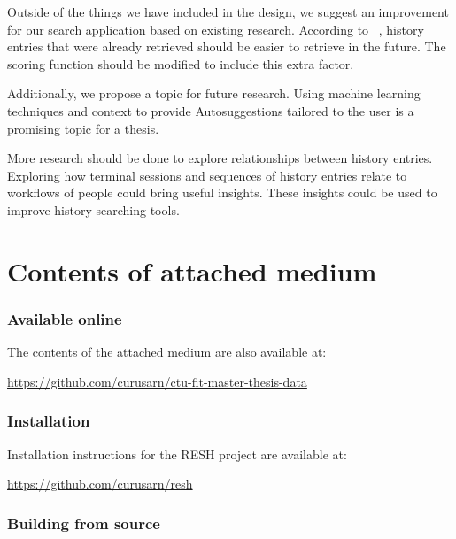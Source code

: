 \documentclass[thesis=M,english]{FITthesis}[2012/10/20]
\newcommand{\todotext}[1]{\textcolor{red}{\textbf{[[#1]]}}}
\let\myCite\cite
\renewcommand\cite{\unskip~\myCite}
\begin{document}
\begin{conclusion}
Outside of the things we have included in the design, we suggest an improvement for our search application based on existing research. According to \cite{greenberg1993computer}, history entries that were already retrieved should be easier to retrieve in the future. The scoring function should be modified to include this extra factor. 

Additionally, we propose a topic for future research. Using machine learning techniques and context to provide Autosuggestions tailored to the user is a promising topic for a thesis. 

More research should be done to explore relationships between history entries. Exploring how terminal sessions and sequences of history entries relate to workflows of people could bring useful insights. These insights could be used to improve history searching tools.

\end{conclusion}




\appendix


\chapter{Contents of attached medium}\label{app:SDcontent}

\subsection*{Available online}

The contents of the attached medium are also available at:

\url{https://github.com/curusarn/ctu-fit-master-thesis-data}

\subsection*{Installation}

Installation instructions for the RESH project are available at:

\url{https://github.com/curusarn/resh}

\subsection*{Building from source}
\end{document}
